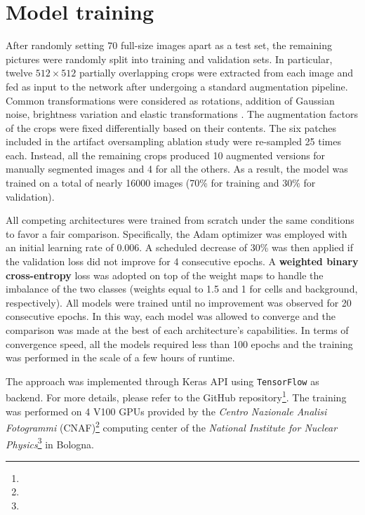 \section{Model training}
\label{sec:model_training}

After randomly setting 70 full-size images apart as a test set, the remaining pictures were randomly split into training and validation sets. 
In particular, twelve $512\times512$ partially overlapping crops were extracted from each image and fed as input to the network after undergoing a standard augmentation pipeline. Common transformations were considered as rotations, addition of Gaussian noise, brightness variation and elastic transformations \cite{elastic_tranformation}. 
The augmentation factors of the crops were fixed differentially based on their contents. 
The six patches included in the artifact oversampling ablation study were re-sampled 25 times each.
Instead, all the remaining crops produced 10 augmented versions for manually segmented images and 4 for all the others.
As a result, the model was trained on a total of nearly 16000 images (70\% for training and 30\% for validation).

All competing architectures were trained from scratch under the same conditions to favor a fair comparison.
Specifically, the Adam \cite{adam} optimizer was employed with an initial learning rate of 0.006. A scheduled decrease of 30\% was then applied if the validation loss did not improve for 4 consecutive epochs. 
A \textbf{weighted binary cross-entropy} loss was adopted on top of the weight maps to handle the imbalance of the two classes (weights equal to 1.5 and 1 for cells and background, respectively).
All models were trained until no improvement was observed for 20 consecutive epochs. In this way, each model was allowed to converge and the comparison was made at the best of each architecture's capabilities.
In terms of convergence speed, all the models required less than 100 epochs and the training was performed in the scale of a few hours of runtime.

The approach was implemented through Keras API \cite{keras} using \texttt{TensorFlow} \cite{tensorflow} as backend. For more details, please refer to the GitHub repository\footnote{\github}.
The training was performed on 4 V100 GPUs provided by the \textit{Centro Nazionale Analisi Fotogrammi} (CNAF)\footnote{\cnaf} computing center of the \textit{National Institute for Nuclear Physics}\footnote{\infn} in Bologna.
